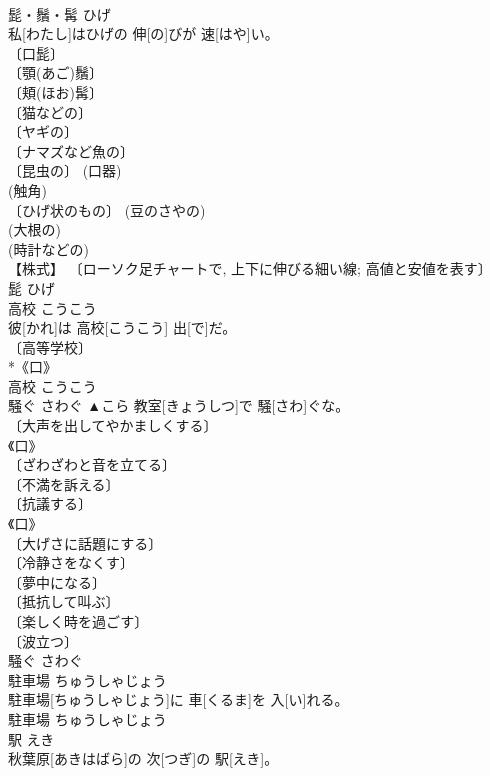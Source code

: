 \documentclass[8pt]{extreport}
\begin{document}
\begin{CJK}{UTF8}{min}
\\	髭・鬚・髯	ひげ	
\\	私[わたし]はひげの 伸[の]びが 速[はや]い。	
\\	〔口髭〕 
\\	〔顎(あご)鬚〕 
\\	〔頬(ほお)髯〕 
\\	〔猫などの〕 
\\	〔ヤギの〕 
\\	〔ナマズなど魚の〕 
\\	〔昆虫の〕 (口器) 
\\	(触角) 
\\	〔ひげ状のもの〕 (豆のさやの) 
\\	(大根の) 
\\	(時計などの) 
\\	【株式】 〔ローソク足チャートで, 上下に伸びる細い線; 高値と安値を表す〕 
\\	髭	ひげ	
\\	高校	こうこう	
\\	彼[かれ]は 高校[こうこう] 出[で]だ。	
\\	〔高等学校〕 
\\	*《口》 
\\	[⇒こうとうがっこう]	高校	こうこう	
\\	騒ぐ	さわぐ	▲こら 教室[きょうしつ]で 騒[さわ]ぐな。	
\\	〔大声を出してやかましくする〕 
\\	《口》 
\\	〔ざわざわと音を立てる〕 
\\	〔不満を訴える〕 
\\	〔抗議する〕 
\\	《口》 
\\	〔大げさに話題にする〕 
\\	〔冷静さをなくす〕 
\\	〔夢中になる〕 
\\	〔抵抗して叫ぶ〕 
\\	〔楽しく時を過ごす〕 
\\	〔波立つ〕 
\\	騒ぐ	さわぐ	
\\	駐車場	ちゅうしゃじょう	
\\	駐車場[ちゅうしゃじょう]に 車[くるま]を 入[い]れる。	
\\	駐車場	ちゅうしゃじょう	
\\	駅	えき	
\\	秋葉原[あきはばら]の 次[つぎ]の 駅[えき]。	

\end{CJK}
\end{document}
